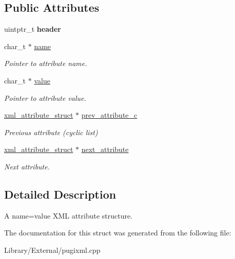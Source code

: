 \subsection*{Public Attributes}
\begin{DoxyCompactItemize}
\item 
\hypertarget{structpugi_1_1xml__attribute__struct_a0dca6ca6c129bbf87a7ebaf87f3e12de}{}uintptr\+\_\+t {\bfseries header}\label{structpugi_1_1xml__attribute__struct_a0dca6ca6c129bbf87a7ebaf87f3e12de}

\item 
\hypertarget{structpugi_1_1xml__attribute__struct_aa886c4aae23a132e1704717721ee2c19}{}char\+\_\+t $\ast$ \hyperlink{structpugi_1_1xml__attribute__struct_aa886c4aae23a132e1704717721ee2c19}{name}\label{structpugi_1_1xml__attribute__struct_aa886c4aae23a132e1704717721ee2c19}

\begin{DoxyCompactList}\small\item\em Pointer to attribute name. \end{DoxyCompactList}\item 
\hypertarget{structpugi_1_1xml__attribute__struct_ae652627d56cb9dcc0afdd1fbf6570364}{}char\+\_\+t $\ast$ \hyperlink{structpugi_1_1xml__attribute__struct_ae652627d56cb9dcc0afdd1fbf6570364}{value}\label{structpugi_1_1xml__attribute__struct_ae652627d56cb9dcc0afdd1fbf6570364}

\begin{DoxyCompactList}\small\item\em Pointer to attribute value. \end{DoxyCompactList}\item 
\hypertarget{structpugi_1_1xml__attribute__struct_a0e3a022235b316e4cfc1034ceb7d7862}{}\hyperlink{structpugi_1_1xml__attribute__struct}{xml\+\_\+attribute\+\_\+struct} $\ast$ \hyperlink{structpugi_1_1xml__attribute__struct_a0e3a022235b316e4cfc1034ceb7d7862}{prev\+\_\+attribute\+\_\+c}\label{structpugi_1_1xml__attribute__struct_a0e3a022235b316e4cfc1034ceb7d7862}

\begin{DoxyCompactList}\small\item\em Previous attribute (cyclic list) \end{DoxyCompactList}\item 
\hypertarget{structpugi_1_1xml__attribute__struct_a9860c0eb7fa72dc9b69ee9b0575f9efc}{}\hyperlink{structpugi_1_1xml__attribute__struct}{xml\+\_\+attribute\+\_\+struct} $\ast$ \hyperlink{structpugi_1_1xml__attribute__struct_a9860c0eb7fa72dc9b69ee9b0575f9efc}{next\+\_\+attribute}\label{structpugi_1_1xml__attribute__struct_a9860c0eb7fa72dc9b69ee9b0575f9efc}

\begin{DoxyCompactList}\small\item\em Next attribute. \end{DoxyCompactList}\end{DoxyCompactItemize}


\subsection{Detailed Description}
A \textquotesingle{}name=value\textquotesingle{} X\+M\+L attribute structure. 

The documentation for this struct was generated from the following file\+:\begin{DoxyCompactItemize}
\item 
Library/\+External/pugixml.\+cpp\end{DoxyCompactItemize}
